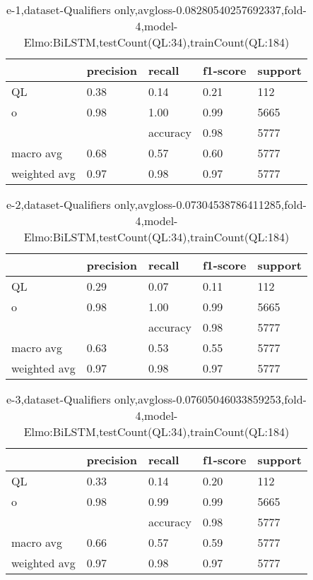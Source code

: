 \begin{table}[!ht] 
\centering
\caption{e-1,dataset-Qualifiers only,avgloss-0.08280540257692337,fold-4,model-Elmo:BiLSTM,testCount(QL:34),trainCount(QL:184)}\label{e-1data-qualS.tsv}
\begin{tabularx}{300pt}{|X|X|X|X|X|}
\hline
&precision&recall&f1-score&support\\
\hline
QL&0.38&0.14&0.21&112\\
\hline
o&0.98&1.00&0.99&5665\\
\hline
&&accuracy&0.98&5777\\
\hline
macro avg&0.68&0.57&0.60&5777\\
\hline
weighted avg&0.97&0.98&0.97&5777\\
\hline
\end{tabularx}
\end{table}
\begin{table}[!ht] 
\centering
\caption{e-2,dataset-Qualifiers only,avgloss-0.07304538786411285,fold-4,model-Elmo:BiLSTM,testCount(QL:34),trainCount(QL:184)}\label{e-2data-qualS.tsv}
\begin{tabularx}{300pt}{|X|X|X|X|X|}
\hline
&precision&recall&f1-score&support\\
\hline
QL&0.29&0.07&0.11&112\\
\hline
o&0.98&1.00&0.99&5665\\
\hline
&&accuracy&0.98&5777\\
\hline
macro avg&0.63&0.53&0.55&5777\\
\hline
weighted avg&0.97&0.98&0.97&5777\\
\hline
\end{tabularx}
\end{table}
\begin{table}[!ht] 
\centering
\caption{e-3,dataset-Qualifiers only,avgloss-0.07605046033859253,fold-4,model-Elmo:BiLSTM,testCount(QL:34),trainCount(QL:184)}\label{e-3data-qualS.tsv}
\begin{tabularx}{300pt}{|X|X|X|X|X|}
\hline
&precision&recall&f1-score&support\\
\hline
QL&0.33&0.14&0.20&112\\
\hline
o&0.98&0.99&0.99&5665\\
\hline
&&accuracy&0.98&5777\\
\hline
macro avg&0.66&0.57&0.59&5777\\
\hline
weighted avg&0.97&0.98&0.97&5777\\
\hline
\end{tabularx}
\end{table}
